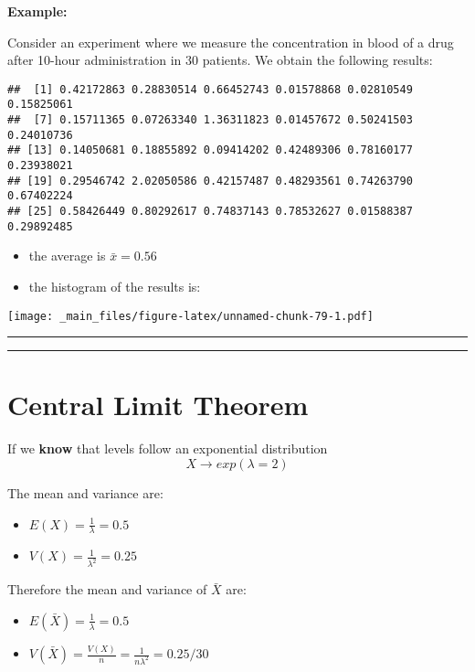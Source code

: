 \documentclass[
]{book}
\providecommand{\tightlist}{%
  \setlength{\itemsep}{0pt}\setlength{\parskip}{0pt}}
\begin{document}
\textbf{Example:}

Consider an experiment where we measure the concentration in blood of a drug after 10-hour administration in \(30\) patients. We obtain the following results:

\begin{verbatim}
##  [1] 0.42172863 0.28830514 0.66452743 0.01578868 0.02810549 0.15825061
##  [7] 0.15711365 0.07263340 1.36311823 0.01457672 0.50241503 0.24010736
## [13] 0.14050681 0.18855892 0.09414202 0.42489306 0.78160177 0.23938021
## [19] 0.29546742 2.02050586 0.42157487 0.48293561 0.74263790 0.67402224
## [25] 0.58426449 0.80292617 0.74837143 0.78532627 0.01588387 0.29892485
\end{verbatim}

\begin{itemize}
\item
  the average is \(\bar{x}=0.56\)
\item
  the histogram of the results is:
\end{itemize}

\texttt{[image: \_main\_files/figure-latex/unnamed-chunk-79-1.pdf]}

\begin{center}\rule{0.5\linewidth}{0.5pt}\end{center}

\begin{center}\rule{0.5\linewidth}{0.5pt}\end{center}

\hypertarget{central-limit-theorem-3}{%
\section{Central Limit Theorem}\label{central-limit-theorem-3}}

If we \textbf{know} that levels follow an exponential distribution \[X \rightarrow exp(\lambda=2)\]

The mean and variance are:

\begin{itemize}
\tightlist
\item
  \(E(X)=\frac{1}{\lambda}=0.5\)
\item
  \(V(X)=\frac{1}{\lambda^2}=0.25\)
\end{itemize}

Therefore the mean and variance of \(\bar{X}\) are:

\begin{itemize}
\tightlist
\item
  \(E(\bar{X})=\frac{1}{\lambda}=0.5\)
\item
  \(V(\bar{X})=\frac{V(X)}{n}=\frac{1}{n\lambda^2}=0.25/30\)
\end{itemize}
\end{document}

